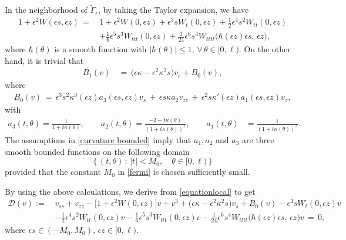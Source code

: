 \documentclass[10pt, reqno]{amsart}
\numberwithin{equation}{section}
\theoremstyle{definition}
\begin{document}
{\medskip
In the neighborhood of $\tilde \Gamma_\epsilon$, by taking the Taylor expansion,
we have
\begin{align} \label{expansion of W}
1+ \epsilon^2 W (\epsilon s, \epsilon z)
 \,=\, & 1+ \epsilon^2 W (0, \epsilon z)+ \epsilon^3s W_t(0, \epsilon z) + \frac 12\epsilon^4s^2 W_{tt}(0, \epsilon z)
\nonumber\\[2mm]
&+ \frac 1 6 \epsilon^5s^3 W_{ttt}(0, \epsilon z)
+\frac{1}{24} \epsilon^6s^4 W_{tttt}\big(\hbar(\epsilon z)\epsilon s, \, \epsilon z\big),
\end{align}
where $\hbar(\theta)$ is a smooth function with $|\hbar(\theta)|\leq 1, \, \forall \, \theta\in [0, \ell)$.
On the other hand, it is trivial that
\begin{align*}
B_1(v) & \,=\, \big(\epsilon \kappa -\epsilon^2 \kappa^2 s \big) v_{s} + B_0(v),
\end{align*}
where
\begin{align}
\label{B0v}
B_0 (v) \,=\, \epsilon^3 s^2 \kappa^3(\epsilon z) a_3(\epsilon s, \epsilon z)v_{s}
\,+\,
\epsilon s \kappa a_2 v_{zz}
\,+\,
\epsilon^2s \kappa'(\epsilon z) a_1(\epsilon s, \epsilon z) v_z,
\end{align}
with
\begin{align}
a_3(t, \theta)=\frac{1}{1+t \kappa (\theta) },
\label{a1a2a3-1}
\qquad
a_2(t, \theta)=\frac{-2-t \kappa (\theta)}{(1+t \kappa (\theta) )^2 },
\qquad
a_1(t, \theta)&=\frac{1}{(1+t \kappa (\theta) )^3 }.
\end{align}
The assumptions in \eqref{curvature bounded} imply that
$a_1, a_2$ and $a_3$ are three smooth bounded functions on the following domain
$$
\Big\{\, (t, \theta)\, :\, |t|<M_0, \quad \theta\in [0, \ell)\, \Big\}
$$
provided that the constant $M_0$ in \eqref{fermi} is chosen sufficiently small.


By using the above calculations, we derive from \eqref{equationlocal} to get
\begin{align} \label{eq4}
{\mathcal D}(v):=\,&v_{ss} + v_{zz} - \big[1+ \epsilon^2 W (0, \epsilon z) \big] v + v^3
+\big(\epsilon \kappa -\epsilon^2 \kappa^2 s \big) v_{s}
+ B_0(v)
- \epsilon^3s W_t(0, \epsilon z) v
\nonumber\\[2mm]
 & - \frac 12 \epsilon^4s^2 W_{tt}(0, \epsilon z) v- \frac 16 \epsilon^5s^3 W_{ttt}(0, \epsilon z)v
 -\frac{1}{24} \epsilon^6s^4 W_{tttt}\big(\hbar(\epsilon z)\epsilon s, \, \epsilon z\big)v \,=\, 0,
\end{align}
where $\epsilon s\in(-M_0, M_0),\, \epsilon z\in [0, \ell)$.



}
\end{document}
